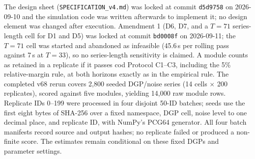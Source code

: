 The design sheet (\texttt{SPECIFICATION\_v4.md}) was locked at commit \texttt{d5d9758} on 2026-09-10 and the simulation code was written afterwards to implement it; no design element was changed after execution. Amendment 1 (D6, D7, and a $T=71$ series-length cell for D1 and D5) was locked at commit \texttt{bd0008f} on 2026-09-11; the $T=71$ cell was started and abandoned as infeasible (45.6\,s per rolling pass against 7\,s at $T=33$), so no series-length sensitivity is claimed. A module counts as retained in a replicate if it passes cod Protocol C1--C3, including the 5\% relative-margin rule, at both horizons exactly as in the empirical rule. The completed v68 rerun covers 2,800 seeded DGP/noise series (14 cells $\times$ 200 replicates), scored against five modules, yielding 14,000 raw module rows. Replicate IDs 0--199 were processed in four disjoint 50-ID batches; seeds use the first eight bytes of SHA-256 over a fixed namespace, DGP cell, noise level to one decimal place, and replicate ID, with NumPy's PCG64 generator. All four batch manifests record source and output hashes; no replicate failed or produced a non-finite score. The estimates remain conditional on these fixed DGPs and parameter settings.

